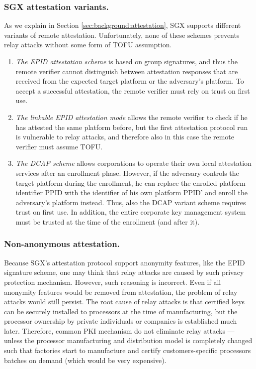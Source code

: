\subsubsection{SGX attestation variants.}
As we explain in Section \ref{sec:background:attestation}, SGX supports different variants of remote attestation. Unfortunately, none of these schemes prevents relay attacks without some form of TOFU assumption.

\begin{enumerate}
	\item \emph{The EPID attestation scheme} is based on group signatures, and thus the remote verifier cannot distinguish between attestation responses that are received from the expected target platform or the adversary's platform. To accept a successful attestation, the remote verifier must rely on trust on first use. 

	\item \emph{The linkable EPID attestation mode} allows the remote verifier to check if he has attested the same platform before, but the first attestation protocol run is vulnerable to relay attacks, and therefore also in this case the remote verifier must assume TOFU. 

	\item \emph{The DCAP scheme} allows corporations to operate their own local attestation services after an enrollment phase. However, if the adversary controls the target platform during the enrollment, he can replace the enrolled platform identifier PPID with the identifier of his own platform PPID' and enroll the adversary's platform instead. Thus, also the DCAP variant scheme requires trust on first use. In addition, the entire corporate key management system must be trusted at the time of the enrollment (and after it).
\end{enumerate}


\subsubsection{Non-anonymous attestation.}
Because SGX's attestation protocol support anonymity features, like the EPID signature scheme, one may think that relay attacks are caused by such privacy protection mechanism. However, such reasoning is incorrect. Even if all anonymity features would be removed from attestation, the problem of relay attacks would still persist. The root cause of relay attacks is that certified keys can be securely installed to processors at the time of manufacturing, but the processor ownership by private individuals or companies is established much later. Therefore, common PKI mechanism do not eliminate relay attacks --- unless the processor manufacturing and distribution model is completely changed such that factories start to manufacture and certify customers-specific processors batches on demand (which would be very expensive).


